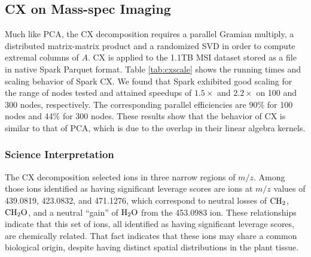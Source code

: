 \subsection{CX on Mass-spec Imaging}
\begin{table}[t]
\centering
{}
\caption{Spark CX running times}
\label{tab:cxscale}
\end{table}
Much like PCA, the CX decomposition requires a parallel Gramian multiply, a distributed matrix-matrix product and a randomized SVD in order to compute extremal columns of $A$. CX is applied to the 1.1TB MSI dataset stored as a file in native Spark Parquet format. Table \ref{tab:cxscale} shows the running times and scaling behavior of Spark CX. We found that Spark exhibited good scaling for the range of nodes tested and attained speedups of $1.5\times$ and $2.2\times$ on 100 and 300 nodes, respectively. The corresponding parallel efficiencies are 90\% for 100 nodes and 44\% for 300 nodes. These results show that the behavior of CX is similar to that of PCA, which is due to the overlap in their linear algebra kernels.
\subsubsection{Science Interpretation}
 The CX decomposition selected ions in three narrow regions of $m/z$. Among those ions identified as having significant leverage scores are ions at $m/z$ values of 439.0819, 423.0832, and 471.1276, which correspond to neutral losses of $\rm{CH_2}$, $\rm{CH_2O}$, and a neutral ``gain'' of $\rm{H_2O}$ from the 453.0983 ion.  These relationships indicate that this set of ions, all identified as having significant leverage scores, are chemically related.  That fact indicates that these ions may share a common biological origin, despite having distinct spatial distributions in the plant tissue.  

